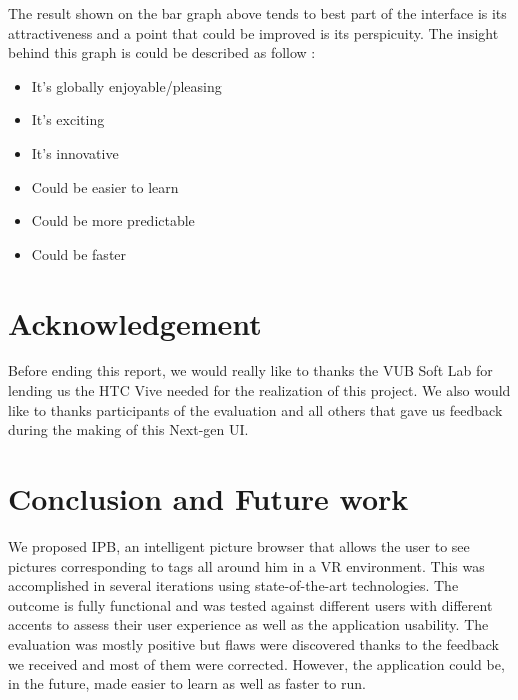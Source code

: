 \documentclass[11pt,a4paper]{article}
\begin{document}
The result shown on the bar graph above tends to best part of the interface is its attractiveness and a point that could be improved is its perspicuity. The insight behind this graph is could be described as follow :

\begin{itemize}
	\item It’s globally enjoyable/pleasing
	\item It’s exciting
	\item It’s innovative 
	\item Could be easier to learn 
	\item Could be more predictable
	\item Could be faster
\end{itemize}


\section{Acknowledgement}

Before ending this report, we would really like to thanks the VUB Soft Lab for lending us the HTC Vive needed for the realization of this project.
We also would like to thanks participants of the evaluation and all others that gave us feedback during the making of this Next-gen UI.

\section{Conclusion and Future work}
We proposed IPB, an intelligent picture browser that allows the user to see pictures corresponding to tags all around him in a VR environment. This was accomplished in several iterations using state-of-the-art technologies. The outcome is fully functional and was tested against different users with different accents to assess their user experience as well as the application usability. The evaluation was mostly positive but flaws were discovered thanks to the feedback we received and most of them were corrected. However, the application could be, in the future, made easier to learn as well as faster to run.
\pagebreak



\end{document}
